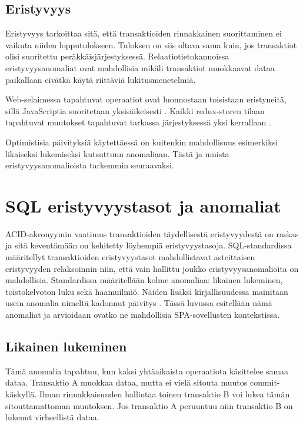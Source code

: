 \documentclass[finnish,twoside,censored,csm,sw-track-2018]{HYthesisML}
\begin{document}
\subsection{Eristyvyys}

Eristyvyys tarkoittaa sitä, että transaktioiden rinnakkainen suorittaminen ei vaikuta niiden lopputulokseen. Tuloksen on siis oltava sama kuin, jos transaktiot olisi suoritettu peräkkäisjärjestyksessä. Relaatiotietokannoissa eristyvyysanomaliat ovat mahdollisia mikäli transaktiot muokkaavat dataa paikallaan eivätkä käytä riittäviä lukitusmenetelmiä.

Web-selaimessa tapahtuvat operaatiot ovat luonnostaan toisistaan eristyneitä, sillä JavaScriptia suoritetaan yksisäikeisesti \citep{JSdefguide}. Kaikki redux-storen tilaan tapahtuvat muutokset tapahtuvat tarkassa järjestyksessä yksi kerrallaan \cite{redux-principles}.

Optimistisia päivityksiä käytettäessä on kuitenkin mahdollisuus esimerkiksi likaiseksi lukemiseksi kutsuttuun anomaliaan. Tästä ja muista eristyvyysanomalioista tarkemmin seuraavaksi.

\section{SQL eristyvyystasot ja anomaliat}

ACID-akronyymin vaatimus transaktioiden täydellisestä eristyvyydestä on raskas ja sitä keventämään on kehitetty löyhempiä eristyvyystasoja. SQL-standardissa \cite{iso-sql-92, gray-ansi} määritellyt transaktioiden eristyvyystasot mahdollistavat asteittaisen eristyvyyden relaksoinnin niin, että vain hallittu joukko eristyvyysanomalioita on mahdollisia. Standardissa määritellään kolme anomaliaa: likainen lukeminen, toistokelvoton luku sekä haamuilmiö. Näiden lisäksi kirjallisuudessa mainitaan usein anomalia nimeltä kadonnut päivitys \citep{Kleppmann}. Tässä luvussa esitellään nämä anomaliat ja arvioidaan ovatko ne mahdollisia SPA-sovellusten kontekstissa.

\subsection{Likainen lukeminen}

Tämä anomalia tapahtuu, kun kaksi yhtäaikaista operaatiota käsittelee samaa dataa. Transaktio A muokkaa dataa, mutta ei vielä sitouta muutos commit-käskyllä. Ilman rinnakkaisuuden hallintaa toinen transaktio B voi lukea tämän sitouttamattoman muutoksen. Jos transaktio A peruuntuu niin transaktio B on lukenut virheellistä dataa.
\end{document}
